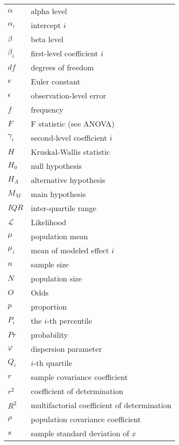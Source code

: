 \begin{longtable}{p{}p{}}
  $\alpha$          & alpha level \\
  $\alpha_i$        & intercept $i$ \\
  $\beta$           & beta level \\
  $\beta_i$         & first-level coefficient $i$ \\
  $df$              & degrees of freedom \\
  $e$               & Euler constant \\
  $\epsilon$        & observation-level error \\
  $f$               & frequency \\
  $F$               & F statistic (see ANOVA)\\
  $\gamma_i$        & second-level coefficient $i$ \\
  $H$               & Kruskal-Wallis statistic \\
  $H_0$             & null hypothesis \\
  $H_A$             & alternative hypothesis \\
  $M_M$             & main hypothesis \\
  $IQR$             & inter-quartile range \\
  $\mathcal{L}$     & Likelihood \\
  $\mu$             & population mean \\
  $\mu_i$           & mean of modeled effect $i$ \\
  $n$               & sample size \\
  $N$               & population size \\
  $O$               & Odds \\
  $p$               & proportion \\
  $P_i$             & the $i$-th percentile \\
  $Pr$              & probability \\
  $\varphi$         & dispersion parameter \\
  $Q_i$             & $i$-th quartile \\
  $r$               & sample covariance coefficient \\
  $r^2$             & coefficient of determination \\
  $R^2$             & multifactorial coefficient of determination \\
  $\rho$            & population covariance coefficient \\
  $s$               & sample standard deviation of $x$ \\

\end{longtable}
